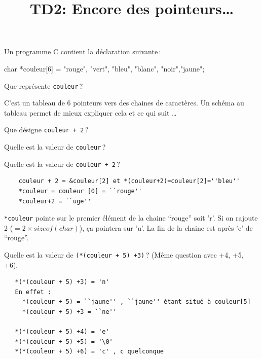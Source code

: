 \documentclass[10pt]{article}\usepackage[nu]{esial}
\begin{document}
\title{TD2: Encore des pointeurs\ldots}
\maketitle

\bigskip\bigskip\Exercice Un programme C contient la déclaration suivante\,:

\medskip

\begin{boxedverbatim}
  char *couleur[6] = {"rouge", "vert", "bleu", "blanc", "noir","jaune"};
\end{boxedverbatim}

\Question Que représente {\tt couleur}\,?

\begin{Reponse}
  C'est un tableau de 6 pointeurs vers des chaines de caractères. Un
  schéma au tableau permet de mieux expliquer cela et ce qui suit
  \ldots
\end{Reponse}

\Question Que  désigne {\tt couleur + 2}\,?

\Question Quelle est la valeur de {\tt *couleur}\,?

\Question Quelle est la valeur de {\tt *couleur + 2}\,?

\begin{Reponse}
\begin{verbatim} 
    couleur + 2 = &couleur[2] et *(couleur+2)=couleur[2]=''bleu''
    *couleur = couleur [0] = ``rouge''
    *couleur+2 = ``uge''
\end{verbatim}

\noindent\verb?*couleur? pointe sur le premier élément de la chaine ``rouge''
soit 'r'. Si on rajoute 2 ($= 2 \times sizeof(char)$), ça pointera sur 'u'. La
fin de la chaine est après 'e' de ``rouge''.
\end{Reponse}

\Question Quelle est la valeur de {\tt *(*(couleur + 5) +3)}\,? (Même
question avec +4, +5, +6).

\begin{Reponse}
\begin{verbatim} 
   *(*(couleur + 5) +3) = 'n' 
   En effet : 
     *(couleur + 5) = ``jaune'' , ``jaune'' étant situé à couleur[5] 
     *(couleur + 5) +3 = ``ne''

   *(*(couleur + 5) +4) = 'e' 
   *(*(couleur + 5) +5) = '\0' 
   *(*(couleur + 5) +6) = 'c' , c quelconque 
\end{verbatim}
~
\end{Reponse}
\end{document}
